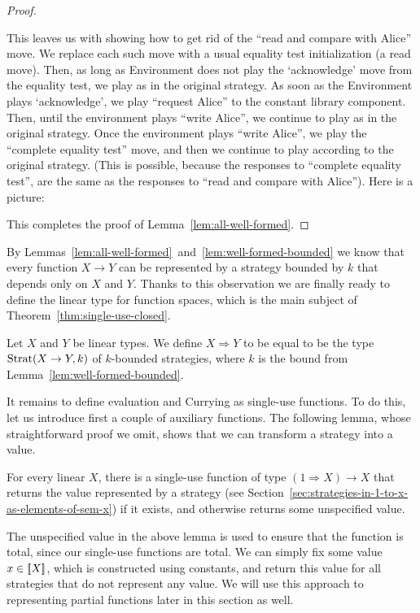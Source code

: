 \begin{proof}
\begin{enumerate}
    This leaves us with showing how to get rid of the ``read and compare with Alice'' move. 
    We replace each such move with a usual equality test initialization (a read move). 
    Then, as long as Environment does not play the `acknowledge' move from the equality test, 
    we play as in the original strategy. As soon as the Environment plays `acknowledge', 
    we play ``request Alice'' to the constant library component. Then, until the environment 
    plays ``write Alice'', we continue to play as in the original strategy. Once the environment
    plays ``write Alice'', we play the ``complete equality test'' move, and then we continue 
    to play according to the original strategy. (This is possible, because the responses 
    to ``complete equality test'', are the same as the responses to ``read and compare with Alice''). 
    Here is a picture:
    \end{enumerate}
    This completes the proof of Lemma~\ref{lem:all-well-formed}. 
\end{proof}
By Lemmas~\ref{lem:all-well-formed}~and~\ref{lem:well-formed-bounded} we know that every function $X \to Y$ 
can be represented by a strategy bounded by $k$ that depends only on $X$ and $Y$. Thanks to this observation 
we are finally ready to define the linear type for function spaces, which is the main subject of Theorem~\ref{thm:single-use-closed}.
\begin{definition} Let $X$ and $Y$ be linear types. 
    We define $X \Rightarrow Y$ to be equal to be the type  $\text{Strat}(X \to Y, k)$ of $k$-bounded strategies, where $k$ is the bound from Lemma~\ref{lem:well-formed-bounded}.
\end{definition}

It remains to define evaluation and Currying as single-use functions. To do this, 
let us introduce first a couple of auxiliary functions.
The following lemma, whose straightforward proof we omit, shows that we can transform a strategy into a value. 
\begin{lemma}\label{lem:evaluate-to-values}
    For every linear $X$, there is a single-use function of type $(1 \Rightarrow X) \to X$ that returns the value represented by a strategy (see  Section~\ref{sec:strategies-in-1-to-x-as-elements-of-sem-x}) if it exists, and otherwise returns some unspecified  value.
\end{lemma}

The unspecified value in the above lemma is used to ensure that the function is total, since our single-use functions are total. We can simply fix some value $x \in [{\kern-0.45ex}[X]{\kern-0.45ex}]$, which is constructed using constants, and return this value for all strategies that do not represent any value. We will use this approach to representing partial functions later in this section as well.

